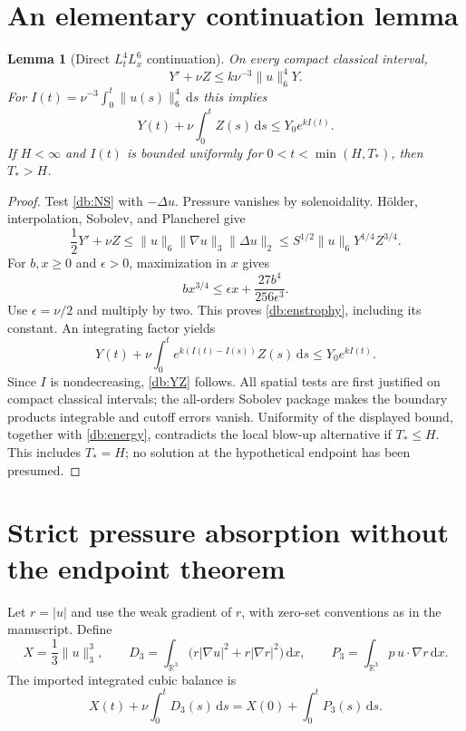 \documentclass[11pt,a4paper]{article}
\newtheorem{lemma}[theorem]{Lemma}
\theoremstyle{definition}\newtheorem{hypothesis}[theorem]{Hypothesis}
\theoremstyle{remark}\newtheorem{remark}[theorem]{Remark}
\newcommand{\R}{\mathbb R}
\newcommand{\dd}{\,\mathrm d}
\newcommand{\norm}[1]{\lVert #1\rVert}
\numberwithin{equation}{section}
\begin{document}
\section{An elementary continuation lemma}
\begin{lemma}[Direct $L^4_tL^6_x$ continuation]\label{db:direct}
On every compact classical interval,
\begin{equation}\label{db:enstrophy}
 Y'+\nu Z\le k\nu^{-3}\norm u_6^4Y.
\end{equation}
For $I(t)=\nu^{-3}\int_0^t\norm{u(s)}_6^4\dd s$ this implies
\begin{equation}\label{db:YZ}
 Y(t)+\nu\int_0^t Z(s)\dd s\le Y_0e^{kI(t)}.
\end{equation}
If $H<\infty$ and $I(t)$ is bounded uniformly for
$0<t<\min(H,T_*)$, then $T_*>H$.
\end{lemma}
\begin{proof}
Test \eqref{db:NS} with $-\Delta u$. Pressure vanishes by solenoidality.
H\"older, interpolation, Sobolev, and Plancherel give
\[
 \frac12Y'+\nu Z
 \le\norm u_6\norm{\nabla u}_3\norm{\Delta u}_2
 \le S^{1/2}\norm u_6Y^{1/4}Z^{3/4}.
\]
For $b,x\ge0$ and $\epsilon>0$, maximization in $x$ gives
\[
 bx^{3/4}\le\epsilon x+\frac{27b^4}{256\epsilon^3}.
\]
Use $\epsilon=\nu/2$ and multiply by two. This proves
\eqref{db:enstrophy}, including its constant. An integrating factor yields
\[
 Y(t)+\nu\int_0^t e^{k(I(t)-I(s))}Z(s)\dd s\le Y_0e^{kI(t)}.
\]
Since $I$ is nondecreasing, \eqref{db:YZ} follows. All spatial tests are first
justified on compact classical intervals; the all-orders Sobolev package
makes the boundary products integrable and cutoff errors vanish. Uniformity
of the displayed bound, together with \eqref{db:energy}, contradicts the
local blow-up alternative if $T_*\le H$. This includes $T_*=H$; no solution
at the hypothetical endpoint has been presumed.
\end{proof}

\section{Strict pressure absorption without the endpoint theorem}
Let $r=|u|$ and use the weak gradient of $r$, with zero-set conventions as in
the manuscript. Define
\begin{equation}\label{db:D3}
 X=\frac13\norm u_3^3,\qquad
 D_3=\int_{\R^3}\bigl(r|\nabla u|^2+r|\nabla r|^2\bigr)\dd x,
 \qquad P_3=\int_{\R^3}p\,u\cdot\nabla r\dd x.
\end{equation}
The imported integrated cubic balance is
\begin{equation}\label{db:cubic}
 X(t)+\nu\int_0^tD_3(s)\dd s=X(0)+\int_0^tP_3(s)\dd s.
\end{equation}
\end{document}
